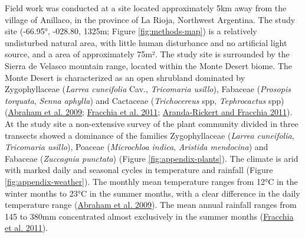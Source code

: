 \documentclass[english,msc,numbers,hidelinks]{coppe}
\begin{document}
  Field work was conducted at a site located approximately 5km away from the village of Anillaco, in the province of La Rioja, Northwest Argentina. The study site (-66.95°, -028.80, 1325m; Figure \ref{fig:methods-map}) is a relatively undisturbed natural area, with little human disturbance and no artificial light source, and a area of approximately 75m². The study site is surrounded by the Sierra de Velasco mountain range, located within the Monte Desert biome. The Monte Desert is characterized as an open shrubland dominated by Zygophyllaceae (\emph{Larrea cuneifolia} Cav., \emph{Tricomaria usillo}), Fabaceae (\emph{Prosopis torquata}, \emph{Senna aphylla}) and Cactaceae (\emph{Trichocereus} spp, \emph{Tephrocactus} spp) (\protect\hyperlink{ref-abraham2009}{Abraham et al. 2009}; \protect\hyperlink{ref-fracchia2011}{Fracchia et al. 2011}; \protect\hyperlink{ref-aranda-rickert2011a}{Aranda-Rickert and Fracchia 2011}). At the study site a non-extensive survey of the plant community divided in three transects showed a dominance of the families Zygophyllaceae (\emph{Larrea cuneifolia}, \emph{Tricomaria usillo}), Poaceae (\emph{Microchloa indica}, \emph{Aristida mendocina}) and Fabaceae (\emph{Zuccagnia punctata}) (Figure \ref{fig:appendix-plants}). The climate is arid with marked daily and seasonal cycles in temperature and rainfall (Figure \ref{fig:appendix-weather}). The monthly mean temperature ranges from 12°C in the winter months to 23°C in the summer months, with a clear difference in the daily temperature range (\protect\hyperlink{ref-abraham2009}{Abraham et al. 2009}). The mean annual rainfall ranges from 145 to 380mm concentrated almost exclusively in the summer months (\protect\hyperlink{ref-fracchia2011}{Fracchia et al. 2011}).
\end{document}
